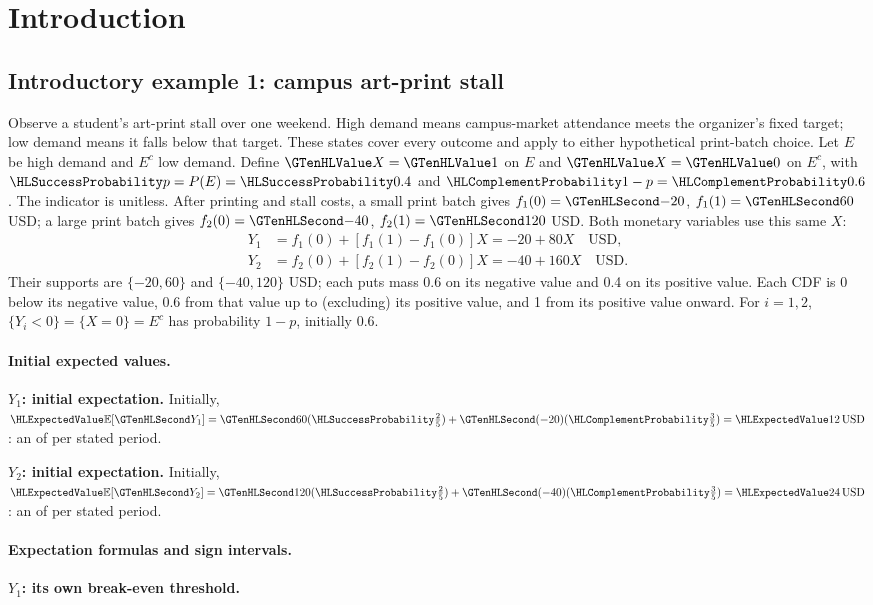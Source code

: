 \section{Introduction}\label{sec:t2-c3-introduction}
\subsection{Introductory example 1: campus art-print stall}\label{ex:intro-one}
Observe a student's art-print stall over one weekend. High demand means campus-market
attendance meets the organizer's fixed target; low demand means it falls below that target.
These states cover every outcome and apply to either hypothetical print-batch choice.
Let $E$ be high demand and
$E^c$ low demand. Define $\Indicator{X}=\Indicator{1}$ on $E$ and
$\Indicator{X}=\Indicator{0}$ on $E^c$, with $\SuccessProb{p}=P(E)=\SuccessProb{0.4}$
and $\FailureProb{1-p}=\FailureProb{0.6}$. The indicator is unitless.
After printing and stall costs, a small print batch gives $f_1(0)=\Money{-20}$, $f_1(1)=\Money{60}$ USD;
a large print batch gives $f_2(0)=\Money{-40}$, $f_2(1)=\Money{120}$ USD.
Both monetary variables use this same $X$:
\[
\begin{aligned}
Y_1&=f_1(0)+[f_1(1)-f_1(0)]X=-20+80X\quad\text{USD},\\
Y_2&=f_2(0)+[f_2(1)-f_2(0)]X=-40+160X\quad\text{USD}.
\end{aligned}
\]
Their supports are $\{-20,60\}$ and $\{-40,120\}$ USD; each puts mass 0.6
on its negative value and 0.4 on its positive value. Each CDF is 0 below its
negative value, 0.6 from that value up to (excluding) its positive value,
and 1 from its positive value onward.
For $i=1,2$, $\{Y_i<0\}=\{X=0\}=E^c$ has probability $1-p$, initially 0.6.
\paragraph{Initial expected values.}
\textbf{$Y_1$: initial expectation.}
Initially, $\ExpectedValue{\mathbb E}[\Money{Y_1}]=\Money{60}(\SuccessProb{\frac{2}{5}})+\Money{(-20)}(\FailureProb{\frac{3}{5}})=\ExpectedValue{12\,\text{USD}}$:
an  of  per stated period.

\textbf{$Y_2$: initial expectation.}
Initially, $\ExpectedValue{\mathbb E}[\Money{Y_2}]=\Money{120}(\SuccessProb{\frac{2}{5}})+\Money{(-40)}(\FailureProb{\frac{3}{5}})=\ExpectedValue{24\,\text{USD}}$:
an  of  per stated period.
\paragraph{Expectation formulas and sign intervals.}
\textbf{$Y_1$: its own break-even threshold.}

